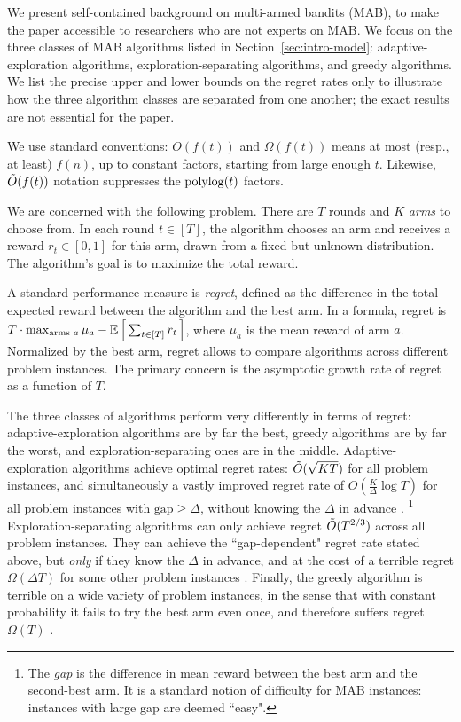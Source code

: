 We present self-contained background on multi-armed bandits (MAB), to make the paper accessible to researchers who are not experts on MAB. 
We focus on the three classes of MAB algorithms listed in Section~\ref{sec:intro-model}: adaptive-exploration algorithms, exploration-separating algorithms, and greedy algorithms. We list the precise upper and lower bounds on the regret rates only to illustrate how the three algorithm classes are separated from one another; the exact results are not essential for the paper. 

We use standard conventions: $O(f(t))$ and $\Omega(f(t))$ means at most (resp., at least) $f(n)$, up to constant factors, starting from large enough $t$. Likewise, $\tilde{O}(f(t))$ notation suppresses the $\polylog(t)$ factors.

We are concerned with the following problem. There are $T$ rounds and $K$ \emph{arms} to choose from. In each round $t\in [T]$, the algorithm chooses an arm and receives a reward $r_t\in[0,1]$ for this arm, drawn from a fixed but unknown distribution. The algorithm's goal is to maximize the total reward.

A standard performance measure is \emph{regret}, defined as the difference in the total expected reward between the algorithm and the best arm. In a formula, regret is
    $T\cdot \max_{\text{arms $a$}}\mu_a
    -  \E\sbr{ \sum_{t\in[T]} r_t }$,
where $\mu_a$ is the mean reward of arm $a$.
Normalized by the best arm, regret allows to compare algorithms across different problem instances.
The primary concern is the asymptotic growth rate of regret as a function of $T$.

The three classes of algorithms perform very differently in terms of regret: adaptive-exploration algorithms are by far the best, greedy algorithms are by far the worst, and exploration-separating ones are in the middle. Adaptive-exploration algorithms achieve optimal regret rates:
    $\tilde{O}(\sqrt{KT})$
for all problem instances, and simultaneously a vastly improved regret rate of
    $O(\tfrac{K}{\Delta}\log T)$
for all problem instances with $\text{gap}\geq \Delta$, without knowing the $\Delta$ in advance
\citep{Lai-Robbins-85,bandits-ucb1,bandits-exp3}.%
\footnote{The \emph{gap} is the difference in mean reward between the best arm and the second-best arm. It is a standard notion of difficulty for MAB instances: instances with large gap are deemed  ``easy".}
Exploration-separating algorithms can only achieve regret $\tilde{O}(T^{2/3})$ across all problem instances. They can achieve the ``gap-dependent" regret rate stated above, but \emph{only} if they know the $\Delta$ in advance, and at the cost of a terrible regret $\Omega(\Delta T)$ for some other problem instances \citep{MechMAB-ec09}. Finally, the greedy algorithm is terrible on a wide variety of problem instances, in the sense that with constant probability it fails to try the best arm even once, and therefore suffers regret $\Omega(T)$
\citep[see Chapter 11.2 in][]{slivkins-MABbook}.


